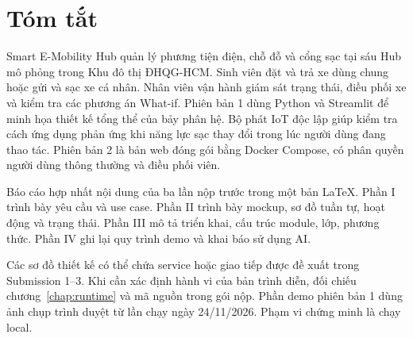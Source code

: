 \chapter*{Tóm tắt}
Smart E-Mobility Hub quản lý phương tiện điện, chỗ đỗ và cổng sạc tại sáu Hub mô phỏng
trong Khu đô thị ĐHQG-HCM. Sinh viên đặt và trả xe dùng chung hoặc gửi và sạc xe cá nhân.
Nhân viên vận hành giám sát trạng thái, điều phối xe và kiểm tra các phương án What-if.
Phiên bản 1 dùng Python và Streamlit để minh họa thiết kế tổng thể của bảy phân hệ.\newline
Bộ phát IoT độc lập giúp kiểm tra cách ứng dụng
phản ứng khi năng lực sạc thay đổi trong lúc người dùng đang thao tác.
Phiên bản 2 là bản web đóng gói bằng Docker Compose, có phân quyền người dùng
thông thường và điều phối viên.
\par
Báo cáo hợp nhất nội dung của ba lần nộp trước trong một bản LaTeX.
Phần I trình bày yêu cầu và use case. Phần II trình bày mockup, sơ đồ tuần tự,
hoạt động và trạng thái. Phần III mô tả triển khai, cấu trúc module, lớp,
phương thức. Phần IV ghi lại quy trình demo và khai báo sử dụng AI.
\par
Các sơ đồ thiết kế có thể chứa service hoặc giao tiếp được đề xuất trong Submission 1--3.
Khi cần xác định hành vi của bản trình diễn, đối chiếu chương~\ref{chap:runtime}
và mã nguồn trong gói nộp. Phần demo phiên bản 1 dùng ảnh chụp trình duyệt từ
lần chạy ngày 24/11/2026. Phạm vi chứng minh là chạy local.
